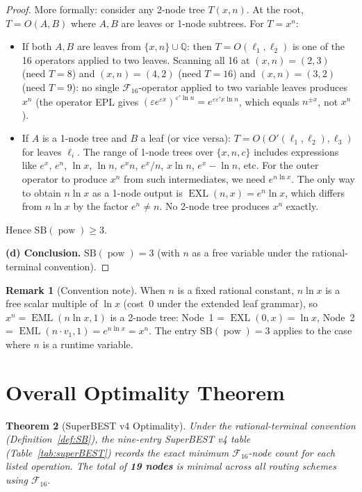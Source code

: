 \documentclass[12pt,a4paper]{article}
\newtheorem{theorem}{Theorem}[section]
\theoremstyle{definition}
\newtheorem{remark}[theorem]{Remark}
\newcommand{\EML}{\operatorname{EML}}
\newcommand{\EXL}{\operatorname{EXL}}
\newcommand{\powop}{\operatorname{pow}}
\newcommand{\SB}{\mathrm{SB}}
\newcommand{\F}{\mathcal{F}_{16}}
\begin{document}
\begin{proof}
More formally: consider any 2-node tree $T(x,n)$.  At the root, $T = O(A,B)$
where $A,B$ are leaves or 1-node subtrees.  For $T = x^n$:
\begin{itemize}
  \item If both $A,B$ are leaves from $\{x,n\}\cup\mathbb{Q}$: then $T = O(\ell_1,\ell_2)$
    is one of the 16 operators applied to two leaves.  Scanning all 16 at
    $(x,n) = (2,3)$ (need $T=8$) and $(x,n) = (4,2)$ (need $T=16$)
    and $(x,n) = (3,2)$ (need $T=9$): no single $\F$-operator applied to
    two variable leaves produces $x^n$ (the operator EPL gives
    $(\varepsilon e^{\varepsilon x})^{\varepsilon'\ln n} = e^{\varepsilon\varepsilon' x\ln n}$,
    which equals $n^{\pm x}$, not $x^n$).
  \item If $A$ is a 1-node tree and $B$ a leaf (or vice versa):
    $T = O(O'(\ell_1,\ell_2), \ell_3)$ for leaves $\ell_i$.
    The range of 1-node trees over $\{x,n,c\}$ includes expressions like
    $e^x$, $e^n$, $\ln x$, $\ln n$, $e^x n$, $e^x/n$, $x\ln n$, $e^x-\ln n$, etc.
    For the outer operator to produce $x^n$ from such intermediates,
    we need $e^{n\ln x}$.  The only way to obtain $n\ln x$ as a 1-node output
    is $\EXL(n, x) = e^n \ln x$, which differs from $n\ln x$ by the factor $e^n \ne n$.
    No 2-node tree produces $x^n$ exactly.
\end{itemize}
Hence $\SB(\powop) \ge 3$.

\textbf{(d) Conclusion.} $\SB(\powop) = 3$ (with $n$ as a free variable
under the rational-terminal convention).
\end{proof}

\begin{remark}[Convention note]
When $n$ is a fixed rational constant, $n\ln x$ is a free scalar multiple of
$\ln x$ (cost~0 under the extended leaf grammar), so $x^n = \EML(n\ln x, 1)$
is a 2-node tree: Node~1 = $\EXL(0,x) = \ln x$,
Node~2 = $\EML(n\cdot v_1, 1) = e^{n\ln x} = x^n$.
The entry $\SB(\powop) = 3$ applies to the case where $n$ is a runtime variable.
\end{remark}

\section{Overall Optimality Theorem}
\label{sec:main}

\begin{theorem}[SuperBEST v4 Optimality]
\label{thm:main}
Under the rational-terminal convention (Definition~\ref{def:SB}),
the nine-entry SuperBEST v4 table (Table~\ref{tab:superBEST}) records
the exact minimum $\mathcal{F}_{16}$-node count for each listed operation.
The total of \textbf{19 nodes} is minimal across all routing schemes using $\F$.
\end{theorem}
\end{document}
